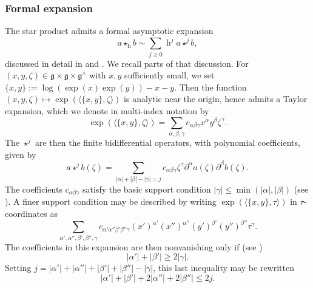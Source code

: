 \documentclass[reqno]{amsart}
\DeclareMathOperator{\h}{h}
\theoremstyle{plain} \newtheorem{theorem} {Theorem}
\theoremstyle{definition} \newtheorem{definition} [theorem] {Definition}
\theoremstyle{itplain} %
\numberwithin{equation}{section}
\numberwithin{theorem}{section}
\renewcommand{\geq}{\geqslant}
\renewcommand{\leq}{\leqslant}
\begin{document}
\subsubsection{Formal expansion}\label{sec:formal-expansion}
The star product admits a formal asymptotic expansion  
\begin{equation*}
  a \star_{\h} b \sim \sum_{j \geq 0} \h^j a \star^j b,
\end{equation*}
discussed in detail in \cite[\S4.2, \S4.6]{nelson-venkatesh-1} and \cite[\S9.2]{2020arXiv201202187N}.  We recall parts of that discussion.
For $(x,y,\zeta) \in \mathfrak{g} \times \mathfrak{g} \times \mathfrak{g}^\wedge$ with $x,y$ sufficiently small, we set $\{x,y\} := \log(\exp(x) \exp(y)) - x - y$.  Then the function $(x,y,\zeta) \mapsto \exp (\langle \{x, y\}, \zeta  \rangle)$ is analytic near the origin, hence admits a Taylor expansion, which we denote in multi-index notation by
\begin{equation*}
  \exp (\langle \{x, y\}, \zeta  \rangle)
  = \sum _{\alpha, \beta , \gamma } c _{\alpha \beta \gamma } x ^\alpha y ^\beta \zeta ^\gamma.
\end{equation*}
The $\star^j$ are then the finite bidifferential operators, with polynomial coefficients, given by
\begin{equation*}
  a \star^j b(\zeta) = \sum  _{|\alpha| + |\beta| - |\gamma| = j} c_{\alpha \beta \gamma} \zeta^\gamma \partial^\alpha a(\zeta) \partial^\beta b(\zeta).
\end{equation*}
The coefficients $c_{\alpha \beta \gamma}$ satisfy the basic support condition $|\gamma| \leq \min(|\alpha|,|\beta|)$ (see \cite[(9.3)]{2020arXiv201202187N}).  A finer support condition may be described by writing $\exp (\langle \{x, y\}, \tau  \rangle)$ in $\tau$-coordinates as
\begin{equation*}
  \sum _{\alpha ', \alpha '', \beta ', \beta '' , \gamma }
  c _{\alpha ' \alpha '' \beta ' \beta '' \gamma }
  (x ' ) ^{\alpha ' }
  (x '') ^{\alpha ''}
  (y ') ^{\beta '}
  (y '' ) ^{\beta ''}
  \tau ^\gamma.
\end{equation*}
The coefficients in this expansion are then nonvanishing only if (see \cite[Lemma 9.13]{2020arXiv201202187N})
\begin{equation*}
  |\alpha '| + |\beta '| \geq 2 |\gamma|.
\end{equation*}
Setting $j = |\alpha'| + |\alpha ''| + |\beta '| + |\beta ''| - |\gamma|$, this last inequality may be rewritten
\begin{equation}\label{eq:alpha-refined-support-condition}
  |\alpha '| + |\beta ' | + 2 | \alpha '' | + 2 |\beta ''| \leq 2 j.
\end{equation}
\end{document}
